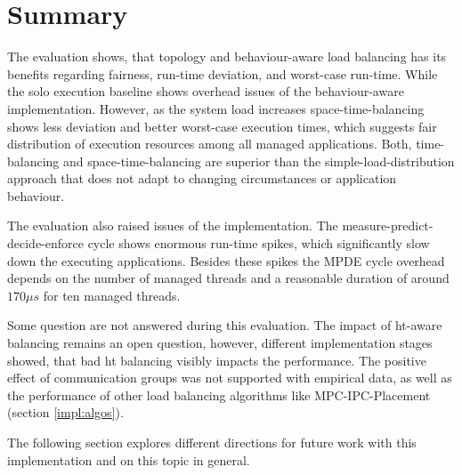 \section{Summary}
\label{eval:summary}

The evaluation shows, that topology and behaviour-aware load balancing has its
benefits regarding fairness, run-time deviation, and worst-case run-time.
While the solo execution baseline shows overhead issues of the behaviour-aware
implementation.
However, as the system load increases space-time-balancing shows less deviation
and better worst-case execution times, which suggests fair distribution of
execution resources among all managed applications.
Both, time-balancing and space-time-balancing are superior than the
simple-load-distribution approach that does not adapt to changing
circumstances or application behaviour.

The evaluation also raised issues of the implementation.
The measure-predict-decide-enforce cycle shows enormous run-time spikes, which
significantly slow down the executing applications.
Besides these spikes the MPDE cycle overhead depends on the number of managed
threads and a reasonable duration of around $170\mu{}s$ for ten managed
threads.

Some question are not answered during this evaluation.
The impact of \gls{ht}-aware balancing remains an open question, however,
different implementation stages showed, that bad \gls{ht} balancing visibly
impacts the performance.
The positive effect of communication groups was not supported with empirical
data, as well as the performance of other load balancing algorithms
like MPC-IPC-Placement (section \ref{impl:algos}).

The following section explores different directions for future work with this
implementation and on this topic in general.
